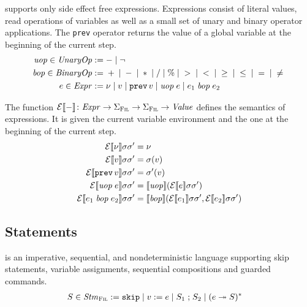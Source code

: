 \documentclass[a4paper,10pt,english]{article}
\begin{document}
\Fil supports only side effect free expressions. Expressions consist of literal values, read operations of variables as
well as a small set of unary and binary operator applications. The \texttt{prev} operator returns the value of a global
variable at the beginning of the current step.
\begin{align*}
	\mathit{uop} \in \mathit{UnaryOp} & := - \mid \neg
	\\
    \mathit{bop} \in \mathit{BinaryOp} & := {} + {} \mid {} - {} \mid {} \ast {} \mid {} / {}
                       \mid {} \% {} \mid {} > {} \mid {} < {} \mid {} \geq {} 
                       \mid {} \leq {} \mid {} = {} \mid {} \neq {}
	\\
	e \in \mathit{Expr} & := 
		\nu \mid
		v \mid
		\mathtt{prev} \,v \mid
		\mathit{uop}\; e \mid
		e_1 \;\mathit{bop}\; e_2
\end{align*}

The function $\mathcal{E} \llbracket - \rrbracket \colon \mathit{Expr} \rightarrow \Sigma_\textsc{Fil} \rightarrow \Sigma_\textsc{Fil} \rightarrow \mathit{Value}$ defines the semantics of
expressions. It is given the current variable environment and the one at the beginning of the current step.
\begin{align*}
	\mathcal{E} \llbracket \nu \rrbracket \sigma \sigma' &= \nu \\
	\mathcal{E} \llbracket v \rrbracket \sigma \sigma' &= \sigma(v) \\
	\mathcal{E} \llbracket \mathtt{prev} \,v \rrbracket \sigma \sigma' &= \sigma'(v) \\
	\mathcal{E} \llbracket \mathit{uop}\; e \rrbracket \sigma \sigma' &= \llbracket \mathit{uop} \rrbracket (\mathcal{E} \llbracket e \rrbracket \sigma \sigma')
	\\
	\mathcal{E} \llbracket e_1 \;\mathit{bop}\; e_2 \rrbracket \sigma \sigma' &= \llbracket \mathit{bop} \rrbracket (\mathcal{E} \llbracket e_1 \rrbracket
	\sigma \sigma', \mathcal{E} \llbracket e_2 \rrbracket \sigma \sigma')
\end{align*}

\subsection{Statements}

\Fil is an imperative, sequential, and nondeterministic language supporting skip statements, variable assignments, sequential
compositions and guarded commands.
\begin{align*}
	S \in \mathit{Stm}_\textsc{Fil} & :=
		\mathtt{skip} \mid 
		v\; \mathtt{:=}\; e \mid 
		S_1 \; \mathtt{;} \; S_2 \mid
		(e \; \mathtt{\twoheadrightarrow} \; S)^*
\end{align*}
\end{document}
